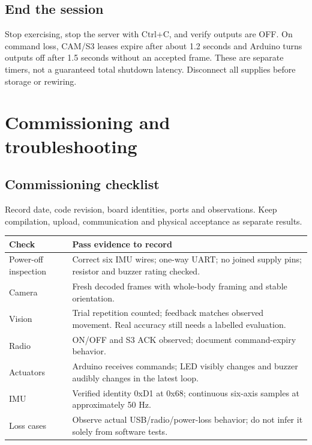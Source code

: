 \documentclass[11pt,a4paper]{article}
\newcommand{\page}[1]{\clearpage\section{#1}}
\begin{document}
\subsection{End the session}
Stop exercising, stop the server with Ctrl+C, and verify outputs are OFF. On command loss, CAM/S3 leases expire after about 1.2 seconds and Arduino turns outputs off after 1.5 seconds without an accepted frame. These are separate timers, not a guaranteed total shutdown latency. Disconnect all supplies before storage or rewiring.
\page{Commissioning and troubleshooting}
\subsection{Commissioning checklist}
Record date, code revision, board identities, ports and observations. Keep compilation, upload, communication and physical acceptance as separate results.
\par\begin{tabularx}{\linewidth}{@{}l X@{}}\toprule
Check & Pass evidence to record\\\midrule
Power-off inspection & Correct six IMU wires; one-way UART; no joined supply pins; resistor and buzzer rating checked.\\
Camera & Fresh decoded frames with whole-body framing and stable orientation.\\
Vision & Trial repetition counted; feedback matches observed movement. Real accuracy still needs a labelled evaluation.\\
Radio & ON/OFF and S3 ACK observed; document command-expiry behavior.\\
Actuators & Arduino receives commands; LED visibly changes and buzzer audibly changes in the latest loop.\\
IMU & Verified identity 0xD1 at 0x68; continuous six-axis samples at approximately 50 Hz.\\
Loss cases & Observe actual USB/radio/power-loss behavior; do not infer it solely from software tests.\\\bottomrule
\end{tabularx}
\end{document}
